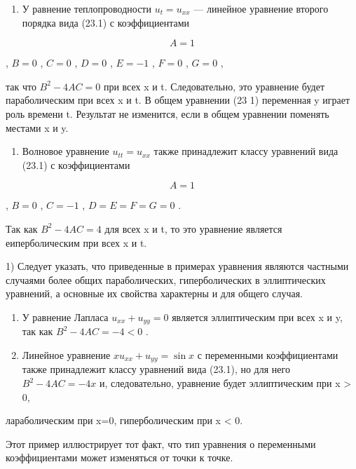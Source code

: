 \documentclass[
  ukrainian,
]{article}
\providecommand{\tightlist}{%
  \setlength{\itemsep}{0pt}\setlength{\parskip}{0pt}}
\begin{document}
\begin{enumerate}
\def\labelenumi{\arabic{enumi}.}
\tightlist
\item
  У равнение теплопроводности \(u_t = u_{xx}\) --- линейное уравнение
  второго порядка вида (23.1) с коэффициентами
\end{enumerate}

\[
A=1
\]

, \(B=0\) , \(C=0\) , \(D=0\) , \(E=-1\) , \(F=0\) , \(G=0\) ,

так что \(B^2-4AC=0\) при всех x и t. Следовательно, это уравнение будет
параболическим при всех x и t. В общем уравнении (23 1) переменная y
играет роль времени t. Результат не изменится, если в общем уравнении
поменять местами x и y.

\begin{enumerate}
\def\labelenumi{\arabic{enumi}.}
\setcounter{enumi}{1}
\tightlist
\item
  Волновое уравнение \(u_{tt} = u_{xx}\) также принадлежит классу
  уравнений вида (23.1) с коэффициентами
\end{enumerate}

\[
A=1
\]

, \(B=0\) , \(C=-1\) , \(D=E=F=G=0\) .

Так как \(B^2 - 4AC = 4\) для всех x и t, то это уравнение является
еиперболическим при всех x и t.

1) Следует указать, что приведенные в примерах уравнения являются
частными случаями более общих параболических, гиперболических в
эллиптических уравнений, а основные их свойства характерны и для общего
случая.

\begin{enumerate}
\def\labelenumi{\arabic{enumi}.}
\setcounter{enumi}{2}
\item
  У равнение Лапласа \(u_{xx} + u_{yy} = 0\) является эллиптическим при
  всех x и y, так как \(B^2 - 4AC = -4 < 0\) .
\item
  Линейное уравнение \(xu_{xx} + u_{yy} = \sin x\) с переменными
  коэффициентами также принадлежит классу уравнений вида (23.1), но для
  него \(B^2-4AC=-4x\) и, следовательно, уравнение будет эллиптическим
  при x \textgreater{} 0,
\end{enumerate}

лараболическим при x=0, гиперболическим при x \textless{} 0.

Этот пример иллюстрирует тот факт, что тип уравнения о переменными
коэффициентами может изменяться от точки к точке.
\end{document}
